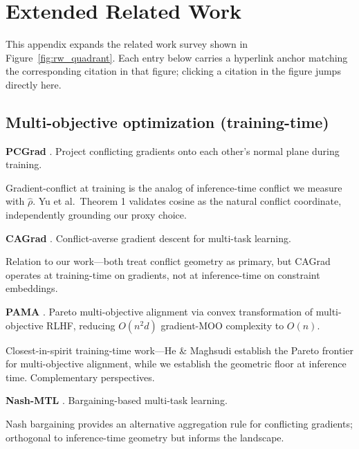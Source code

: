 
\section{Extended Related Work}\label{app:extended_rw}

This appendix expands the related work survey shown in
Figure~\ref{fig:rw_quadrant}. Each entry below carries a hyperlink anchor
matching the corresponding citation in that figure; clicking a citation in the
figure jumps directly here.

\subsection{Multi-objective optimization (training-time)}

\hypertarget{rw:pcgrad}{}\textbf{PCGrad} \citep{yu2020gradient}.
Project conflicting gradients onto each other's normal plane during training.

Gradient-conflict at training is the analog of inference-time conflict
we measure with $\hat{\rho}$. Yu et al.\ Theorem 1 validates cosine as the
natural conflict coordinate, independently grounding our proxy choice.

\hypertarget{rw:cagrad}{}\textbf{CAGrad} \citep{liu2021cagrad}.
Conflict-averse gradient descent for multi-task learning.

Relation to our work---both treat conflict geometry as primary, but
CAGrad operates at training-time on gradients, not at inference-time on
constraint embeddings.

\hypertarget{rw:pama}{}\textbf{PAMA} \citep{he2025pama}.
Pareto multi-objective alignment via convex transformation of multi-objective
RLHF, reducing $O(n^2 d)$ gradient-MOO complexity to $O(n)$.

Closest-in-spirit training-time work---He \& Maghsudi establish the
Pareto frontier for multi-objective alignment, while we establish the geometric
floor at inference time. Complementary perspectives.

\hypertarget{rw:nashmtl}{}\textbf{Nash-MTL} \citep{navon2022nashmtl}.
Bargaining-based multi-task learning.

Nash bargaining provides an alternative aggregation rule for
conflicting gradients; orthogonal to inference-time geometry but informs the
landscape.

